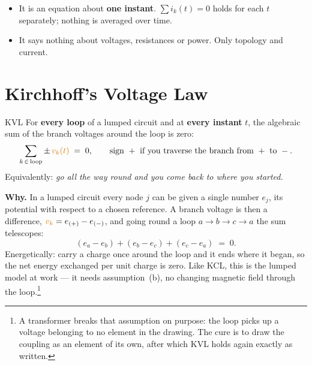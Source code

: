 \documentclass[11pt,a4paper]{article}
\newcommand{\Vcol}[1]{\textcolor{cvolt}{#1}}
\begin{document}
\begin{cautionbox}
\begin{itemize}
  \item It is an equation about \textbf{one instant}. $\sum i_k(t) = 0$ holds for each $t$
        separately; nothing is averaged over time.
  \item It says nothing about voltages, resistances or power. Only topology and current.
\end{itemize}
\end{cautionbox}

\section{Kirchhoff's Voltage Law}

\begin{definitionbox}{KVL}
For \textbf{every loop} of a lumped circuit and at \textbf{every instant} $t$, the
algebraic sum of the branch voltages around the loop is zero:
\[
  \sum_{k \,\in\, \text{loop}} \pm\, \Vcol{v_k(t)} \;=\; 0 ,
  \qquad
  \text{sign } + \text{ if you traverse the branch from } + \text{ to } - .
\]
Equivalently: \emph{go all the way round and you come back to where you started.}
\end{definitionbox}

\textbf{Why.} In a lumped circuit every node $j$ can be given a single number $e_j$, its
potential with respect to a chosen reference. A branch voltage is then a difference,
$\Vcol{v_k} = e_{(+)} - e_{(-)}$, and going round a loop $a \to b \to c \to a$ the sum
telescopes:
\[
  (e_a - e_b) + (e_b - e_c) + (e_c - e_a) \;=\; 0 .
\]
Energetically: carry a charge once around the loop and it ends where it began, so the net
energy exchanged per unit charge is zero. Like KCL, this is the lumped model at work ---
it needs assumption~(b), no changing magnetic field through the loop.\footnote{A
transformer breaks that assumption on purpose: the loop picks up a voltage belonging to no
element in the drawing. The cure is to draw the coupling as an element of its own, after
which KVL holds again exactly as written.}

\begin{center}
\end{center}
\end{document}
